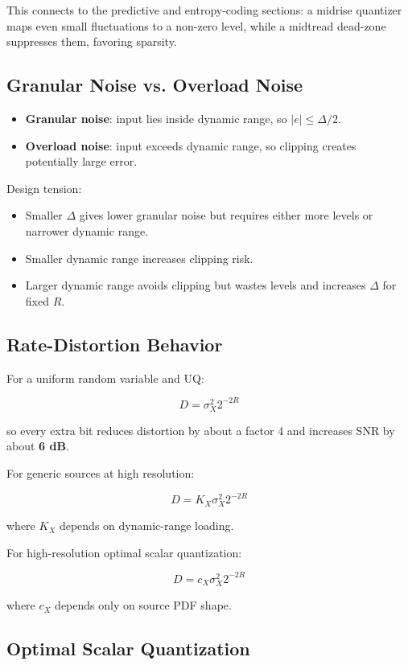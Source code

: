 This connects to the predictive and entropy-coding sections: a midrise quantizer maps even small fluctuations to a non-zero level, while a midtread dead-zone suppresses them, favoring sparsity.

\subsection{Granular Noise vs. Overload Noise}

\begin{itemize}
  \item \textbf{Granular noise}: input lies inside dynamic range, so $|e|\leq\Delta/2$.
  \item \textbf{Overload noise}: input exceeds dynamic range, so clipping creates potentially large error.
\end{itemize}

Design tension:

\begin{itemize}
  \item Smaller $\Delta$ gives lower granular noise but requires either more levels or narrower dynamic range.
  \item Smaller dynamic range increases clipping risk.
  \item Larger dynamic range avoids clipping but wastes levels and increases $\Delta$ for fixed $R$.
\end{itemize}

\subsection{Rate-Distortion Behavior}

For a uniform random variable and UQ:

\[
D=\sigma_X^2 2^{-2R}
\]

so every extra bit reduces distortion by about a factor 4 and increases SNR by about \textbf{6 dB}.

For generic sources at high resolution:

\[
D=K_X\sigma_X^2 2^{-2R}
\]

where $K_X$ depends on dynamic-range loading.

For high-resolution optimal scalar quantization:

\[
D=c_X\sigma_X^2 2^{-2R}
\]

where $c_X$ depends only on source PDF shape.

\subsection{Optimal Scalar Quantization}

